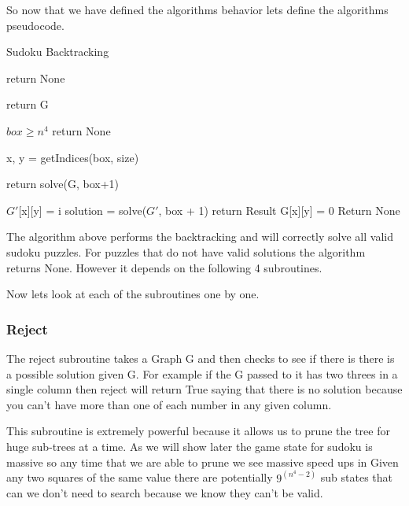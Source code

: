 \documentclass{sig-alternate}
\begin{document}
So now that we have defined the algorithms behavior lets define the algorithms pseudocode.

\begin{algorithm}[H]
\caption{Sudoku Backtracking}\label{solve}
\begin{algorithmic}[1]

\State return None
\EndIf

\State return G
\EndIf

\If $box \ge n^4$
\State return None
\EndIf

\State x, y = getIndices(box, size)

\State return solve(G, box+1)
\EndIf

\State $G'$[x][y] = i
\State solution = solve($G'$, box + 1)
\State return Result
\EndIf
\EndFor
\State G[x][y] = 0
\State Return None
\EndProcedure
\end{algorithmic}
\end{algorithm}

\cite{GeeksforGeeks}
\cite{Backtracking}

The algorithm above performs the backtracking and will correctly solve all valid sudoku puzzles. For puzzles that do not have valid solutions the algorithm returns None. However it depends on the following 4 subroutines. 

Now lets look at each of the subroutines one by one. 

\subsubsection{Reject}
The reject subroutine takes a Graph G and then checks to see if there is there is a possible solution given G. For example if the G passed to it has two threes in a single column then reject will return True saying that there is no solution because you can't have more than one of each number in any given column. 

This subroutine is extremely powerful because it allows us to prune the tree for huge sub-trees at a time. As we will show later the game state for sudoku is massive so any time that we are able to prune we see massive speed ups in  Given any two squares of the same value there are potentially $9^(n^4 - 2)$ sub states that can we don't need to search because we know they can't be valid. 
\end{document}
